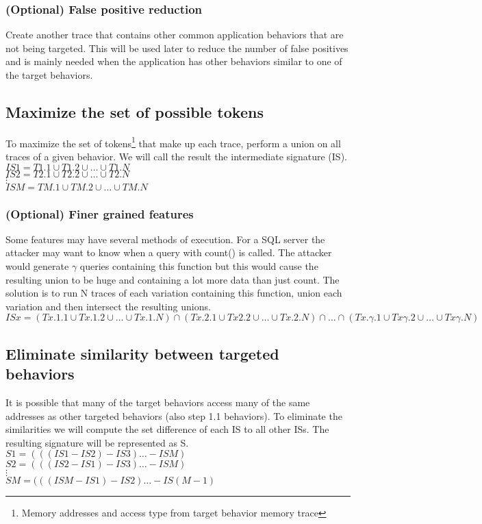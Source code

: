 \documentclass[11pt,a4paper, titlepage, oneside]{article}
\begin{document}
\subsubsection{(Optional) False positive reduction}
Create another trace that contains other common application behaviors that are not being targeted. This will be used later to reduce the number of false positives and is mainly needed when the application has other behaviors similar to one of the target behaviors.

\subsection{Maximize the set of possible tokens}
To maximize the set of tokens\footnote{Memory addresses and access type from target behavior memory trace} that make up each trace, perform a union on all traces of a given behavior.  We will call the result the intermediate signature (IS). \\
$IS1 = T1.1\cup T1.2\cup\ldots\cup T1.N$ \\
$IS2 = T2.1\cup T2.2\cup\ldots\cup T2.N$ \\
$\vdots$ \\
$ISM = TM.1\cup TM.2\cup\ldots\cup TM.N$ 

\subsubsection{(Optional) Finer grained features}
Some features may have several methods of execution. For a SQL server the attacker may want to know when a query with count() is called. The attacker would generate $\gamma$ queries containing this function but this would cause the resulting union to be huge and containing a lot more data than just count. The solution is to run N traces of each variation containing this function, union each variation and then intersect the resulting unions. \\
$ISx = (Tx.1.1\cup Tx.1.2\cup\ldots\cup Tx.1.N)\cap(Tx.2.1\cup Tx2.2\cup\ldots\cup Tx.2.N)\cap\ldots\cap(Tx.\gamma.1\cup Tx\gamma.2\cup\ldots\cup Tx\gamma.N)$

\subsection{Eliminate similarity between targeted behaviors}
It is possible that many of the target behaviors access many of the same addresses as other targeted behaviors (also step 1.1 behaviors). To eliminate the similarities we will compute the set difference of each IS to all other ISs. The resulting signature will be represented as S. \\
$S1 = (((IS1 - IS2) - IS3)\ldots - ISM)$ \\
$S2 = (((IS2 - IS1) - IS3)\ldots - ISM)$ \\
$\vdots$ \\
$SM = (((ISM - IS1) - IS2)\ldots - IS(M-1)$ 
\end{document}
